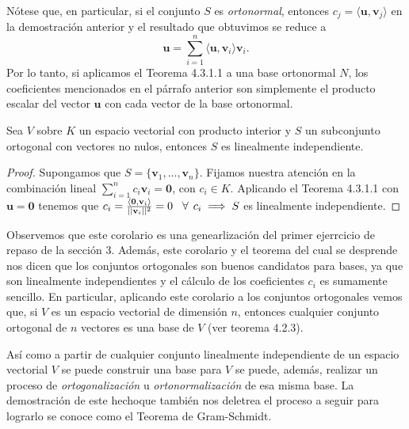 \documentclass[12pt,dvipsnames]{article}
\newenvironment{teorema}[2][Teorema]{\begin{trivlist}
\item[\hskip \labelsep {\bfseries #1}\hskip \labelsep {\bfseries #2.}]}{\end{trivlist}}
\newenvironment{corolario}[2][Corolario]{\begin{trivlist}
\item[\hskip \labelsep {\bfseries #1}]}{\end{trivlist}}
\begin{document}
\begin{teorema} {4.3.1.1}
    Nótese que, en particular, si el conjunto $S$ es \emph{ortonormal}, entonces $c_j=\langle\mathbf{u},\mathbf{v}_j\rangle$ en la demostración anterior y el resultado que obtuvimos se reduce a \[
        \mathbf{u} = \sum_{i=1}^n \langle\mathbf{u},\mathbf{v}_i\rangle\mathbf{v}_i
    .\] \noindent Por lo tanto, si aplicamos el Teorema 4.3.1.1 a una base ortonormal $N$, los coeficientes mencionados en el párrafo anterior son simplemente el producto escalar del vector $\mathbf{u}$ con cada vector de la base ortonormal.

\end{teorema}

\begin{corolario} {4.3.1}
Sea $V$ sobre $K$ un espacio vectorial con producto interior y $S$ un subconjunto ortogonal con vectores no nulos, entonces $S$ es linealmente independiente.

\begin{proof}
    Supongamos que $S=\{\mathbf{v}_1, ..., \mathbf{v}_n\}.$ Fijamos nuestra atención en la combinación lineal $\sum_{i=1}^n c_i\mathbf{v}_i=\mathbf{0}$, con $c_i\in K$. Aplicando el Teorema 4.3.1.1 con $\mathbf{u}=\mathbf{0}$ tenemos que $c_i=\frac{\langle\mathbf{0},\mathbf{v}_i\rangle}{||\mathbf{v}_i||^2}=0\hspace{3mm}\forall\hspace{1.5mm}  c_i\implies S$ es linealmente independiente.
\end{proof}

Observemos que este corolario es una genearlización del primer ejerrcicio de repaso de la sección 3. Además, este corolario y el teorema del cual se desprende nos dicen que los conjuntos ortogonales son buenos candidatos para bases, ya que son linealmente independientes y el cálculo de los coeficientes $c_i$ es sumamente sencillo. En particular, aplicando este corolario a los conjuntos ortogonales vemos que, si $V$ es un espacio vectorial de dimensión $n$, entonces cualquier conjunto ortogonal de $n$ vectores es una base de $V$ (ver teorema 4.2.3). 
\end{corolario}

Así como a partir de cualquier conjunto linealmente independiente de un espacio vectorial $V$ se puede construir una base para $V$ se puede, además, realizar un proceso de \emph{ortogonalización} u \emph{ortonormalización} de esa misma base. La demostración de este hecho\textemdash que también nos deletrea el proceso a seguir para lograrlo\textemdash \hspace{0.5mm} se conoce como el Teorema de Gram-Schmidt.
\end{document}
